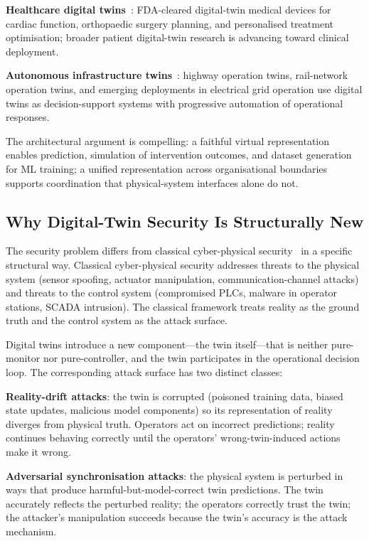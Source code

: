 \documentclass[sigconf,nonacm]{acmart}
\begin{document}
\textbf{Healthcare digital twins}~\cite{viceconti2024healthcaretwin,
fda2024digitaltwin}: FDA-cleared digital-twin medical devices for
cardiac function, orthopaedic surgery planning, and personalised
treatment optimisation; broader patient digital-twin research is
advancing toward clinical deployment.

\textbf{Autonomous infrastructure
twins}~\cite{ahmed2024infratwin,he2024railtwin}: highway operation
twins, rail-network operation twins, and emerging deployments in
electrical grid operation use digital twins as decision-support
systems with progressive automation of operational responses.

The architectural argument is compelling: a faithful virtual
representation enables prediction, simulation of intervention
outcomes, and dataset generation for ML training; a unified
representation across organisational boundaries supports
coordination that physical-system interfaces alone do not.

\subsection{Why Digital-Twin Security Is Structurally New}

The security problem differs from classical cyber-physical
security~\cite{cardenas2024cpssec,humayed2024cpssurv} in a
specific structural way. Classical cyber-physical security addresses
threats to the physical system (sensor spoofing, actuator
manipulation, communication-channel attacks) and threats to the
control system (compromised PLCs, malware in operator stations,
SCADA intrusion). The classical framework treats reality as the
ground truth and the control system as the attack surface.

Digital twins introduce a new component---the twin itself---that is
neither pure-monitor nor pure-controller, and the twin participates
in the operational decision loop. The corresponding attack
surface has two distinct classes:

\textbf{Reality-drift attacks}: the twin is corrupted (poisoned
training data, biased state updates, malicious model components)
so its representation of reality diverges from physical truth.
Operators act on incorrect predictions; reality continues
behaving correctly until the operators' wrong-twin-induced actions
make it wrong.

\textbf{Adversarial synchronisation attacks}: the physical system
is perturbed in ways that produce harmful-but-model-correct twin
predictions. The twin accurately reflects the perturbed reality;
the operators correctly trust the twin; the attacker's
manipulation succeeds because the twin's accuracy is the attack
mechanism.
\end{document}
